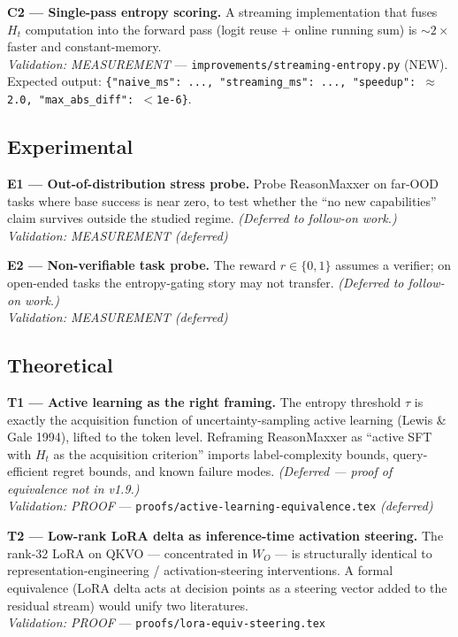 \documentclass[11pt]{article}
\begin{document}
\textbf{C2 --- Single-pass entropy scoring.} A streaming implementation that fuses $H_t$ computation into the forward pass (logit reuse + online running sum) is $\sim 2\times$ faster and constant-memory. \\
\textit{Validation: MEASUREMENT} --- \texttt{improvements/streaming-entropy.py} (NEW). Expected output: \texttt{\{"naive\_ms": ..., "streaming\_ms": ..., "speedup": $\approx$2.0, "max\_abs\_diff": $<$1e-6\}}.

\subsection*{Experimental}

\textbf{E1 --- Out-of-distribution stress probe.} Probe ReasonMaxxer on far-OOD tasks where base success is near zero, to test whether the ``no new capabilities'' claim survives outside the studied regime. \emph{(Deferred to follow-on work.)} \\
\textit{Validation: MEASUREMENT (deferred)}

\textbf{E2 --- Non-verifiable task probe.} The reward $r \in \{0,1\}$ assumes a verifier; on open-ended tasks the entropy-gating story may not transfer. \emph{(Deferred to follow-on work.)} \\
\textit{Validation: MEASUREMENT (deferred)}

\subsection*{Theoretical}

\textbf{T1 --- Active learning as the right framing.} The entropy threshold $\tau$ is exactly the acquisition function of uncertainty-sampling active learning (Lewis \& Gale 1994), lifted to the token level. Reframing ReasonMaxxer as ``active SFT with $H_t$ as the acquisition criterion'' imports label-complexity bounds, query-efficient regret bounds, and known failure modes. \emph{(Deferred --- proof of equivalence not in v1.9.)} \\
\textit{Validation: PROOF} --- \texttt{proofs/active-learning-equivalence.tex} \emph{(deferred)}

\textbf{T2 --- Low-rank LoRA delta as inference-time activation steering.} The rank-32 LoRA on QKVO --- concentrated in $W_O$ --- is structurally identical to representation-engineering / activation-steering interventions. A formal equivalence (LoRA delta acts at decision points as a steering vector added to the residual stream) would unify two literatures. \\
\textit{Validation: PROOF} --- \texttt{proofs/lora-equiv-steering.tex}
\end{document}
